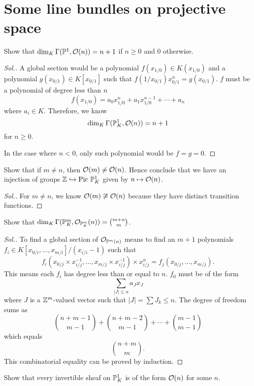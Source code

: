 \documentclass[11pt]{book} %
\begin{document}
\section{Some line bundles on projective space}
\begin{exr}
Show that $\dim_K \Gamma(\mathbb P^1,{\cal O}(n))=n+1$ if $n\geq 0$ and $0$ otherwise.
\end{exr}
\begin{proof}[Sol.]
A global section would be a polynomial  $f(x_{1/0})\in K(x_{1/0})$ and a polynomial $g(x_{0/1})\in K[x_{0/1}]$ such that $f(1/x_{0/1})x_{0/1}^n=g(x_{0/1})$. $f$ must be a polynomial of degree less than $n$
$$
f(x_{1/0})=a_{0}x_{1/0}^n+a_{1}x_{1/0}^{n-1}+\cdots+a_n
$$
where $a_i\in K$. Therefore, we know 
$$
\dim_K\Gamma(\mathbb P^1_K,{\cal O}(n))=n+1
$$
for $n\geq 0$.

In the case where $n<0$, only such polynomial would be $f=g=0$. 
\end{proof}
\begin{exr}
Show that if $m\neq n$, then ${\cal O}(m)\neq {\cal O}(n)$. Hence conclude that we have an injection of groups $\mathbb Z\hookrightarrow \text{Pic\ }\mathbb P^1_K$ given by $n\mapsto {\cal O}(n)$.
\end{exr}
\begin{proof}[Sol.]
For $m\neq n$,  we know ${\cal O}(m)\not\cong {\cal O}(n)$ because they have distinct transition functions.
\end{proof}
\begin{exr}
Show that $\dim_K\Gamma(\mathbb P^m_K,{\cal O}_{\mathbb P^m_K}(n))={m+n\choose m}$.
\end{exr}
\begin{proof}[Sol.]
To find a global section of ${\cal O}_{\mathbb P^m(n)}$ means to find an $m+1$ polynomials
$f_i\in K[x_{0/i},...,x_{m/i}]/(x_{i/i}-1)$ such that
$$
f_i(x_{0/j}\times x_{i/j}^{-1} ,...,x_{m/j}\times x_{i/j}^{-1} )\times x_{i/j}^{n}=f_j(x_{0/j},...,x_{m/j}).
$$
This means each $f_i$ has degree less than or equal to $n$. $f_0$ must be of the form
$$
\sum_{|J|\leq n} a_J x_J
$$
where $J$ is a $\mathbb Z^{m}$-valued vector such that $|J|=\sum J_k\leq n$. The degree of freedom sums as
$$
{n+m-1\choose m-1}+{n+m-2\choose m-1}+\cdots+{m-1\choose m-1}
$$
which equals
$$
{n+m\choose m}.
$$
This combinatorial equality can be proved by induction.
\end{proof}
\begin{exr}
Show that every invertible sheaf on $\mathbb P^1_K$ is of the form ${\cal O}(n)$ for some $n$.
\end{exr}
\end{document}
